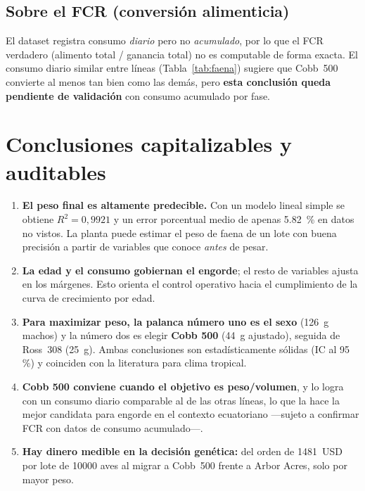 \documentclass[11pt,a4paper]{article}
\begin{document}
\subsection{Sobre el FCR (conversión alimenticia)}
El dataset registra consumo \emph{diario} pero no \emph{acumulado}, por lo que el FCR verdadero
(alimento total / ganancia total) no es computable de forma exacta. El consumo diario similar entre
líneas (Tabla~\ref{tab:faena}) sugiere que Cobb~500 convierte al menos tan bien como las demás, pero
\textbf{esta conclusión queda pendiente de validación} con consumo acumulado por fase.

\section{Conclusiones capitalizables y auditables}

\begin{enumerate}[leftmargin=1.5em,itemsep=4pt]
  \item \textbf{El peso final es altamente predecible.} Con un modelo lineal simple se obtiene
        $R^2 = 0{,}9921$ y un error porcentual medio de apenas \SI{5.82}{\percent} en datos no vistos.
        La planta puede estimar el peso de faena de un lote con buena precisión a partir de variables
        que conoce \emph{antes} de pesar.
  \item \textbf{La edad y el consumo gobiernan el engorde}; el resto de variables ajusta en los márgenes.
        Esto orienta el control operativo hacia el cumplimiento de la curva de crecimiento por edad.
  \item \textbf{Para maximizar peso, la palanca número uno es el sexo} (\SI{+126}{\gram} machos) y la número
        dos es elegir \textbf{Cobb 500} (\SI{+44}{\gram} ajustado), seguida de Ross~308 (\SI{+25}{\gram}).
        Ambas conclusiones son estadísticamente sólidas (IC al 95\,\%) y coinciden con la literatura
        para clima tropical.
  \item \textbf{Cobb 500 conviene cuando el objetivo es peso/volumen}, y lo logra con un consumo diario
        comparable al de las otras líneas, lo que la hace la mejor candidata para engorde en el contexto
        ecuatoriano —sujeto a confirmar FCR con datos de consumo acumulado—.
  \item \textbf{Hay dinero medible en la decisión genética:} del orden de \SI{1481}{USD} por lote de
        \num{10000} aves al migrar a Cobb~500 frente a Arbor Acres, solo por mayor peso.
\end{enumerate}
\end{document}
